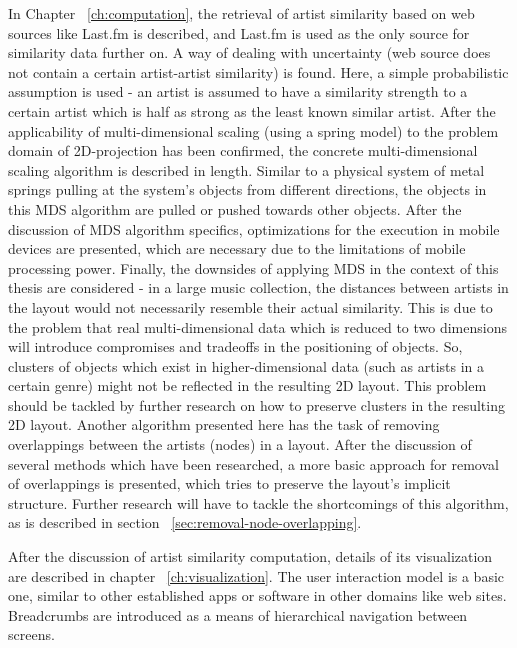In Chapter ~\ref{ch:computation}, the retrieval of artist similarity based on web sources like Last.fm is described, and Last.fm is used as the only source for similarity data further on. A way of dealing with uncertainty (web source does not contain a certain artist-artist similarity) is found. Here, a simple probabilistic assumption is used - an artist is assumed to have a similarity strength to a certain artist which is half as strong as the least known similar artist. After the applicability of multi-dimensional scaling (using a spring model) to the problem domain of 2D-projection has been confirmed, the concrete multi-dimensional scaling algorithm is described in length. Similar to a physical system of metal springs pulling at the system's objects from different directions, the objects in this MDS algorithm are pulled or pushed towards other objects. After the discussion of MDS algorithm specifics, optimizations for the execution in mobile devices are presented, which are necessary due to the limitations of mobile processing power. Finally, the downsides of applying MDS in the context of this thesis are considered - in a large music collection, the distances between artists in the layout would not necessarily resemble their actual similarity. This is due to the problem that real multi-dimensional data which is reduced to two dimensions will introduce compromises and tradeoffs in the positioning of objects. So, clusters of objects which exist in higher-dimensional data (such as artists in a certain genre) might not be reflected in the resulting 2D layout. This problem should be tackled by further research on how to preserve clusters in the resulting 2D layout.
Another algorithm presented here has the task of removing overlappings between the artists (nodes) in a layout. After the discussion of several methods which have been researched, a more basic approach for removal of overlappings is presented, which tries to preserve the layout's implicit structure. Further research will have to tackle the shortcomings of this algorithm, as is described in section ~\ref{sec:removal-node-overlapping}.

After the discussion of artist similarity computation, details of its visualization are described in chapter ~\ref{ch:visualization}. The user interaction model is a basic one, similar to other established apps or software in other domains like web sites. Breadcrumbs are introduced as a means of hierarchical navigation between screens.

